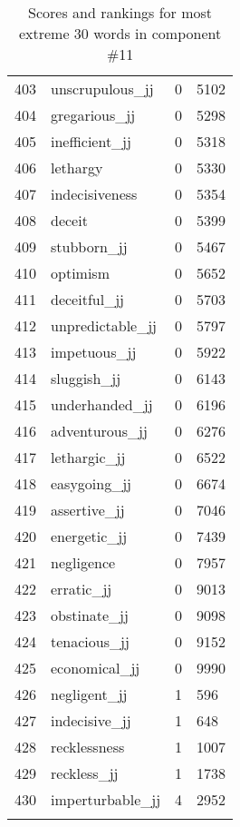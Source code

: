 \begin{longtable}[!htbp]{| rlr@{.}l |}
    403 & unscrupulous\_jj & 0 & 5102 \\
    404 & gregarious\_jj & 0 & 5298 \\
    405 & inefficient\_jj & 0 & 5318 \\
    406 & lethargy & 0 & 5330 \\
    407 & indecisiveness & 0 & 5354 \\
    408 & deceit & 0 & 5399 \\
    409 & stubborn\_jj & 0 & 5467 \\
    410 & optimism & 0 & 5652 \\
    411 & deceitful\_jj & 0 & 5703 \\
    412 & unpredictable\_jj & 0 & 5797 \\
    413 & impetuous\_jj & 0 & 5922 \\
    414 & sluggish\_jj & 0 & 6143 \\
    415 & underhanded\_jj & 0 & 6196 \\
    416 & adventurous\_jj & 0 & 6276 \\
    417 & lethargic\_jj & 0 & 6522 \\
    418 & easygoing\_jj & 0 & 6674 \\
    419 & assertive\_jj & 0 & 7046 \\
    420 & energetic\_jj & 0 & 7439 \\
    421 & negligence & 0 & 7957 \\
    422 & erratic\_jj & 0 & 9013 \\
    423 & obstinate\_jj & 0 & 9098 \\
    424 & tenacious\_jj & 0 & 9152 \\
    425 & economical\_jj & 0 & 9990 \\
    426 & negligent\_jj & 1 & 596 \\
    427 & indecisive\_jj & 1 & 648 \\
    428 & recklessness & 1 & 1007 \\
    429 & reckless\_jj & 1 & 1738 \\
    430 & imperturbable\_jj & 4 & 2952 \\
    \hline
    \caption{Scores and rankings for most extreme 30 words in component \#11} \\
\end{longtable}
